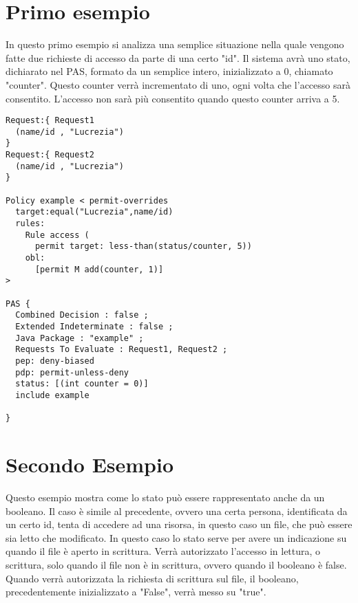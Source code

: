 \documentclass[a4paper, 10pt]{article}
\begin{document}
	\section{Primo esempio} %
	\label{sec:primo_esempio}
	In questo primo esempio si analizza una semplice situazione nella quale vengono fatte due richieste di accesso da parte di una certo "id".
	Il sistema avrà uno stato, dichiarato nel PAS, formato da un semplice intero, inizializzato a 0, chiamato "counter".
	Questo counter verrà incrementato di uno, ogni volta che l'accesso sarà consentito. L'accesso non sarà più consentito quando questo counter arriva a 5.
	\begin{verbatim}
Request:{ Request1 
  (name/id , "Lucrezia")
}
Request:{ Request2 
  (name/id , "Lucrezia")
}

Policy example < permit-overrides 
  target:equal("Lucrezia",name/id) 
  rules: 
    Rule access ( 
      permit target: less-than(status/counter, 5))
    obl: 
      [permit M add(counter, 1)]
>

PAS { 
  Combined Decision : false ;
  Extended Indeterminate : false ;
  Java Package : "example" ;
  Requests To Evaluate : Request1, Request2 ;
  pep: deny-biased
  pdp: permit-unless-deny
  status: [(int counter = 0)]
  include example

}
	\end{verbatim}

\section{Secondo Esempio} %
\label{sec:secondo_esempio}
	Questo esempio mostra come lo stato può essere rappresentato anche da un booleano. Il caso è simile al precedente, ovvero una certa persona, identificata da un certo id, tenta di accedere ad una risorsa, in questo caso un file, che può essere sia letto che modificato.
	In questo caso lo stato serve per avere un indicazione su quando il file è aperto in scrittura. Verrà autorizzato l'accesso in lettura, o scrittura, solo quando il file non è in scrittura, ovvero quando il booleano è false.
	Quando verrà autorizzata la richiesta di scrittura sul file, il booleano, precedentemente inizializzato a "False", verrà messo su "true".
\end{document}
